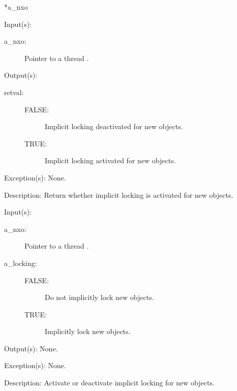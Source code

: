\begin{capi}
{{*a\_nxo}}
	\begin{capilist}
	\item[Input(s): ]
		\begin{description}\item[]
		\item[a\_nxo: ]
			Pointer to a thread .
		\end{description}
	\item[Output(s): ]
		\begin{description}\item[]
		\item[retval: ]
			\begin{description}\item[]
			\item[FALSE: ]
				Implicit locking deactivated for new objects.
			\item[TRUE: ]
				Implicit locking activated for new objects.
			\end{description}
		\end{description}
	\item[Exception(s): ] None.
	\item[Description: ]
		Return whether implicit locking is activated for new objects.
	\end{capilist}
\label{nxo_thread_setlocking}
	\begin{capilist}
	\item[Input(s): ]
		\begin{description}\item[]
		\item[a\_nxo: ]
			Pointer to a thread \classname{nxo}.
		\item[a\_locking: ]
			\begin{description}\item[]
			\item[FALSE: ]
				Do not implicitly lock new objects.
			\item[TRUE: ]
				Implicitly lock new objects.
			\end{description}
		\end{description}
	\item[Output(s): ] None.
	\item[Exception(s): ] None.
	\item[Description: ]
		Activate or deactivate implicit locking for new objects.
	\end{capilist}

\end{capi}

